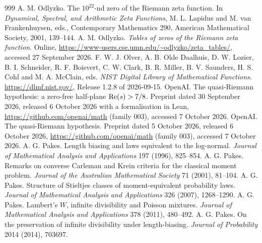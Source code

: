 \begin{thebibliography}{999}
 A. M. Odlyzko. The $10^{22}$-nd zero of the Riemann zeta function. In \emph{Dynamical, Spectral, and Arithmetic Zeta Functions}, M. L. Lapidus and M. van Frankenhuysen, eds., Contemporary Mathematics 290, American Mathematical Society, 2001, 139--144.
 A. M. Odlyzko. \emph{Tables of zeros of the Riemann zeta function}. Online, \url{https://www-users.cse.umn.edu/~odlyzko/zeta_tables/}, accessed 27 September 2026.
 F. W. J. Olver, A. B. Olde Daalhuis, D. W. Lozier, B. I. Schneider, R. F. Boisvert, C. W. Clark, B. R. Miller, B. V. Saunders, H. S. Cohl and M. A. McClain, eds. \emph{NIST Digital Library of Mathematical Functions}. \url{https://dlmf.nist.gov/}, Release 1.2.8 of 2026-09-15.
 OpenAI. The quasi-Riemann hypothesis: a zero-free half-plane $\operatorname{Re}(s)>7/8$. Preprint dated 30 September 2026, released 6 October 2026 with a formalisation in Lean, \url{https://github.com/openai/math} (family 003), accessed 7 October 2026.
 OpenAI. The quasi-Riemann hypothesis. Preprint dated 5 October 2026, released 6 October 2026, \url{https://github.com/openai/math} (family 003), accessed 7 October 2026.
 A. G. Pakes. Length biasing and laws equivalent to the log-normal. \emph{Journal of Mathematical Analysis and Applications} 197 (1996), 825--854.
 A. G. Pakes. Remarks on converse Carleman and Krein criteria for the classical moment problem. \emph{Journal of the Australian Mathematical Society} 71 (2001), 81--104.
 A. G. Pakes. Structure of Stieltjes classes of moment-equivalent probability laws. \emph{Journal of Mathematical Analysis and Applications} 326 (2007), 1268--1290.
 A. G. Pakes. Lambert's $W$, infinite divisibility and Poisson mixtures. \emph{Journal of Mathematical Analysis and Applications} 378 (2011), 480--492.
 A. G. Pakes. On the preservation of infinite divisibility under length-biasing. \emph{Journal of Probability} 2014 (2014), 703697.

\end{thebibliography}
